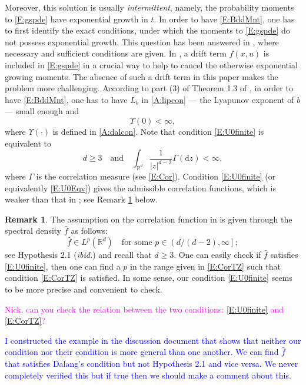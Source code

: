 \documentclass[a4paper,11pt]{article}%
\numberwithin{equation}{section}
\theoremstyle{plain}
\theoremstyle{definition}
\newtheorem{remark}[theorem]{Remark}
\newcommand{\R}{\mathbb{R}}
\newcommand{\ud}{\ensuremath{ \mathrm{d} }}
\begin{document}
Moreover, this solution is usually {\it intermittent}, namely, the probability moments to
\eqref{E:gspde} have exponential growth in $t$. In order to have \eqref{E:BddMnt}, one has to first
identify the exact conditions, under which the moments to \eqref{E:gspde} do not possess exponential
growth. This question has been answered in \cite{CK19}, where necessary and sufficient conditions
are given. In \cite{AM03,MSY15,MSY16}, a drift term $f(x,u)$ is included in \eqref{E:gspde} in a
crucial way to help to cancel the otherwise exponential growing moments. The absence of such a drift
term in this paper makes the problem more challenging.  According to part (3) of Theorem 1.3 of
\cite{CK19}, in order to have \eqref{E:BddMnt}, one has to have $L_b$ in \eqref{A:lipcon} --- the
Lyapunov exponent of $b$ --- small enough and
\begin{equation}
	\label{E:U0finite}
	\Upsilon(0) <\infty,
\end{equation}
where $\Upsilon(\cdot)$ is defined in  \eqref{A:dalcon}. Note that condition \eqref{E:U0finite} is
equivalent to
\begin{equation}
	\label{E:U0Eqv}
	d\ge 3 \quad \text{and} \quad \int_{\R^d} \frac{1}{|z|^{d-2}} \Gamma(\ud z) <\infty,
\end{equation}
where $\Gamma$ is the correlation measure (see \eqref{E:Cor}). Condition \eqref{E:U0finite} (or
equivalently \eqref{E:U0Eqv}) gives the admissible correlation functions, which is weaker
than that in \cite{TZ98}; see Remark \ref{R:Cor} below.

\begin{remark}
	\label{R:Cor}
	The assumption on the correlation function in \cite{TZ98} is given through the spectral density
	$\widehat{f}$ as follows:
	\begin{equation}
		\label{E:CorTZ}
		\widehat{f} \in L^p(\R^d) \quad \text{for some $p\in\left(d/(d-2),\infty\right]$};
	\end{equation}
	see Hypothesis 2.1 ({\it ibid.}) and recall that $d\ge 3$. One can easily check if $\widehat{f}$
	satisfies \eqref{E:U0finite}, then one can find a $p$ in the range given in  \eqref{E:CorTZ} such
	that condition \eqref{E:CorTZ} is satisfied. In some sense, our condition \eqref{E:U0finite} seems
	to be more precise and convenient to check.

	\bigskip
	\textcolor{magenta}{Nick, can you check the relation between the two conditions: \eqref{E:U0finite} and
	\eqref{E:CorTZ}?}

	\textcolor{blue}{I constructed the example in the discussion document that shows that neither our condition nor their condition is more general than one another. We can find $\hat{f}$ that satisfies Dalang's condition but not Hypothesis 2.1 \cite{TZ98} and vice versa. We never completely verified this but if true then we should make a comment about this. }
\end{remark}
\end{document}

